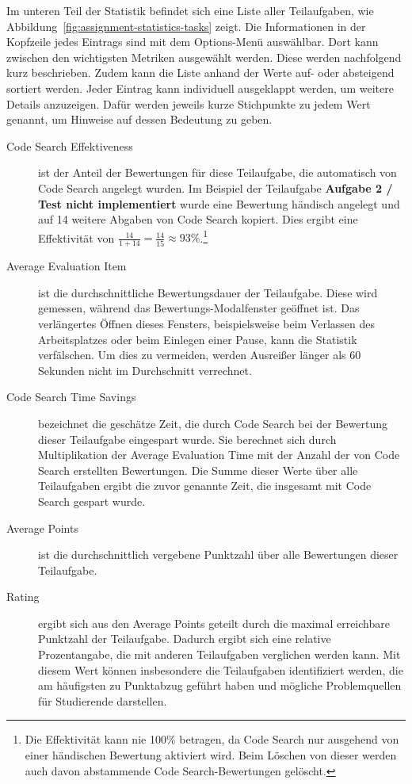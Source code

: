Im unteren Teil der Statistik befindet sich eine Liste aller Teilaufgaben, wie Abbildung~\ref{fig:assignment-statistics-tasks} zeigt.
Die Informationen in der Kopfzeile jedes Eintrags sind mit dem Options-Menü auswählbar.
Dort kann zwischen den wichtigsten Metriken ausgewählt werden.
Diese werden nachfolgend kurz beschrieben.
Zudem kann die Liste anhand der Werte auf- oder absteigend sortiert werden.
Jeder Eintrag kann individuell ausgeklappt werden, um weitere Details anzuzeigen.
Dafür werden jeweils kurze Stichpunkte zu jedem Wert genannt, um Hinweise auf dessen Bedeutung zu geben.

\begin{description}
    \item[Code Search Effektiveness] ist der Anteil der Bewertungen für diese Teilaufgabe, die automatisch von Code Search angelegt wurden.
    Im Beispiel der Teilaufgabe \textbf{Aufgabe 2 / Test nicht implementiert} wurde eine Bewertung händisch angelegt und auf 14 weitere Abgaben von Code Search kopiert.
    Dies ergibt eine Effektivität von $\frac{14}{1 + 14} = \frac{14}{15} \approx 93\%$.\footnote{
        Die Effektivität kann nie 100\% betragen, da Code Search nur ausgehend von einer händischen Bewertung aktiviert wird.
        Beim Löschen von dieser werden auch davon abstammende Code Search-Bewertungen gelöscht.
    }
    \item[Average Evaluation Item] ist die durchschnittliche Bewertungsdauer der Teilaufgabe.
    Diese wird gemessen, während das Bewertungs-Modalfenster geöffnet ist.
    Das verlängertes Öffnen dieses Fensters, beispielsweise beim Verlassen des Arbeitsplatzes oder beim Einlegen einer Pause, kann die Statistik verfälschen.
    Um dies zu vermeiden, werden Ausreißer länger als 60 Sekunden nicht im Durchschnitt verrechnet.
    \item[Code Search Time Savings] bezeichnet die geschätze Zeit, die durch Code Search bei der Bewertung dieser Teilaufgabe eingespart wurde.
    Sie berechnet sich durch Multiplikation der Average Evaluation Time mit der Anzahl der von Code Search erstellten Bewertungen.
    Die Summe dieser Werte über alle Teilaufgaben ergibt die zuvor genannte Zeit, die insgesamt mit Code Search gespart wurde.
    \item[Average Points] ist die durchschnittlich vergebene Punktzahl über alle Bewertungen dieser Teilaufgabe.
    \item[Rating] ergibt sich aus den Average Points geteilt durch die maximal erreichbare Punktzahl der Teilaufgabe.
    Dadurch ergibt sich eine relative Prozentangabe, die mit anderen Teilaufgaben verglichen werden kann.
    Mit diesem Wert können insbesondere die Teilaufgaben identifiziert werden, die am häufigsten zu Punktabzug geführt haben und mögliche Problemquellen für Studierende darstellen.
\end{description}

